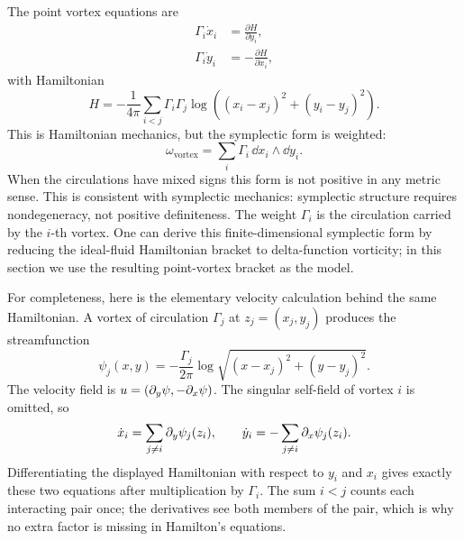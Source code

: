 The point vortex equations are
\[
\begin{aligned}
  \Gamma_i\dot x_i &= \frac{\partial H}{\partial y_i},\\
  \Gamma_i\dot y_i &= -\frac{\partial H}{\partial x_i},
\end{aligned}
\]
with Hamiltonian
\[
  H
  =
  -\frac{1}{4\pi}
  \sum_{i<j}\Gamma_i\Gamma_j
  \log\left((x_i-x_j)^2+(y_i-y_j)^2\right).
\]
This is Hamiltonian mechanics, but the symplectic form is weighted:
\[
  \omega_{\mathrm{vortex}}
  =
  \sum_i \Gamma_i\,\dd x_i\wedge\dd y_i.
\]
When the circulations have mixed signs this form is not positive in any metric
sense. This is consistent with symplectic mechanics: symplectic structure
requires nondegeneracy, not positive definiteness.
The weight \(\Gamma_i\) is the circulation carried by the \(i\)-th vortex. One
can derive this finite-dimensional symplectic form by reducing the ideal-fluid
Hamiltonian bracket to delta-function vorticity; in this section we use the
resulting point-vortex bracket as the model.

For completeness, here is the elementary velocity calculation behind the same
Hamiltonian.  A vortex of circulation \(\Gamma_j\) at \(z_j=(x_j,y_j)\)
produces the streamfunction
\[
  \psi_j(x,y)=-\frac{\Gamma_j}{2\pi}
  \log\sqrt{(x-x_j)^2+(y-y_j)^2}.
\]
The velocity field is \(u=(\partial_y\psi,-\partial_x\psi)\).  The singular self-field of
vortex \(i\) is omitted, so
\[
  \dot x_i
  =
  \sum_{j\ne i}\partial_y\psi_j(z_i),
  \qquad
  \dot y_i
  =
  -\sum_{j\ne i}\partial_x\psi_j(z_i).
\]
Differentiating the displayed Hamiltonian with respect to \(y_i\) and \(x_i\)
gives exactly these two equations after multiplication by \(\Gamma_i\).  The
sum \(i<j\) counts each interacting pair once; the derivatives see both members
of the pair, which is why no extra factor is missing in Hamilton's equations.

